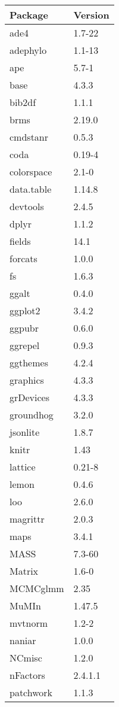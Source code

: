 \begin{longtable}{p{2.5cm}p{2.5cm}}
  \toprule
Package & Version \\ 
  \midrule
ade4 & 1.7-22 \\ 
  adephylo & 1.1-13 \\ 
  ape & 5.7-1 \\ 
  base & 4.3.3 \\ 
  bib2df & 1.1.1 \\ 
  brms & 2.19.0 \\ 
  cmdstanr & 0.5.3 \\ 
  coda & 0.19-4 \\ 
  colorspace & 2.1-0 \\ 
  data.table & 1.14.8 \\ 
  devtools & 2.4.5 \\ 
  dplyr & 1.1.2 \\ 
  fields & 14.1 \\ 
  forcats & 1.0.0 \\ 
  fs & 1.6.3 \\ 
  ggalt & 0.4.0 \\ 
  ggplot2 & 3.4.2 \\ 
  ggpubr & 0.6.0 \\ 
  ggrepel & 0.9.3 \\ 
  ggthemes & 4.2.4 \\ 
  graphics & 4.3.3 \\ 
  grDevices & 4.3.3 \\ 
  groundhog & 3.2.0 \\ 
  jsonlite & 1.8.7 \\ 
  knitr & 1.43 \\ 
  lattice & 0.21-8 \\ 
  lemon & 0.4.6 \\ 
  loo & 2.6.0 \\ 
  magrittr & 2.0.3 \\ 
  maps & 3.4.1 \\ 
  MASS & 7.3-60 \\ 
  Matrix & 1.6-0 \\ 
  MCMCglmm & 2.35 \\ 
  MuMIn & 1.47.5 \\ 
  mvtnorm & 1.2-2 \\ 
  naniar & 1.0.0 \\ 
  NCmisc & 1.2.0 \\ 
  nFactors & 2.4.1.1 \\ 
  patchwork & 1.1.3 \\ 

\end{longtable}
